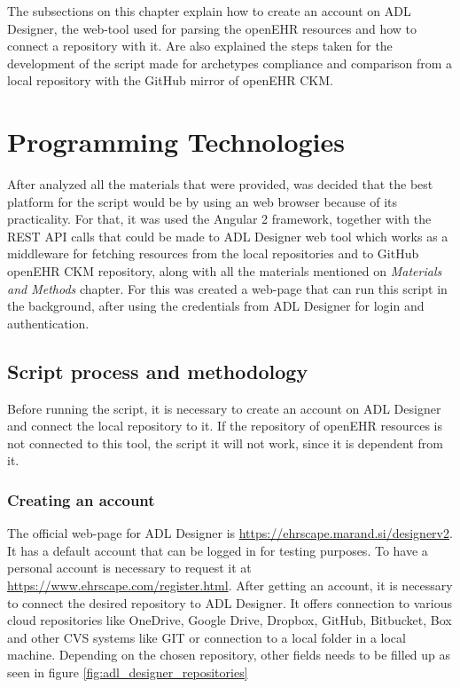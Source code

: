 \documentclass[mim_thesis.tex]{subfiles}
\begin{document}
The subsections on this chapter explain how to create an account on ADL Designer, the web-tool used for parsing the openEHR resources and how to connect a repository with it. Are also explained the steps taken for the development of the script made for archetypes compliance and comparison from a local repository with the GitHub mirror of openEHR CKM.  


\section{Programming Technologies}
After analyzed all the materials that were provided, was decided that the best platform for the script would be by using an web browser because of its practicality. For that, it was used the Angular 2 framework, together with the REST API calls that could be made to ADL Designer web tool which works as a middleware for fetching resources from the local repositories and to GitHub openEHR CKM repository, along with all the materials mentioned on \textit{Materials and Methods} chapter. For this was created a web-page that can run this script in the background, after using the credentials from ADL Designer for login and authentication.


\subsection{Script process and methodology}

Before running the script, it is necessary to create an account on ADL Designer and connect the local repository to it. If the repository of openEHR resources is not connected to this tool, the script it will not work, since it is dependent from it.

\subsubsection{Creating an account}
The official web-page for ADL Designer is \url{https://ehrscape.marand.si/designerv2}. It has a default account that can be logged in for testing purposes. To have a personal account is necessary to request it at \url{https://www.ehrscape.com/register.html}.
After getting an account, it is necessary to connect the desired repository to ADL Designer. It offers connection to various cloud repositories like OneDrive, Google Drive, Dropbox, GitHub, Bitbucket, Box and other CVS systems like GIT or connection to a local folder in a local machine. Depending on the chosen repository, other fields needs to be filled up as seen in figure \ref{fig:adl_designer_repositories}
\end{document}
